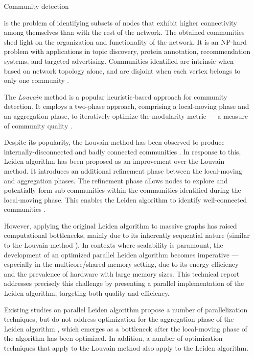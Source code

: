 Community detection is the problem of identifying subsets of nodes that exhibit higher connectivity among themselves than with the rest of the network. The obtained communities shed light on the organization and functionality of the network. It is an NP-hard problem with applications in topic discovery, protein annotation, recommendation systems, and targeted advertising. Communities identified are intrinsic when based on network topology alone, and are disjoint when each vertex belongs to only one community \cite{com-gregory10}. The \textit{Louvain} method \cite{com-blondel08} is a popular heuristic-based approach for community detection. It employs a two-phase approach, comprising a local-moving phase and an aggregation phase, to iteratively optimize the modularity metric --- a measure of community quality \cite{com-newman06}.

Despite its popularity, the Louvain method has been observed to produce internally-disconnected and badly connected communities \cite{com-traag19}. In response to this, Leiden algorithm has been proposed as an improvement over the Louvain method. It introduces an additional refinement phase between the local-moving and aggregation phases. The refinement phase allows nodes to explore and potentially form sub-communities within the communities identified during the local-moving phase. This enables the Leiden algorithm to identify well-connected communities \cite{com-traag19}.

However, applying the original Leiden algorithm to massive graphs has raised computational bottlenecks, mainly due to its inherently sequential nature (similar to the Louvain method \cite{com-halappanavar17}). In contexts where scalability is paramount, the development of an optimized parallel Leiden algorithm becomes imperative --- especially in the multicore/shared memory setting, due to its energy efficiency and the prevalence of hardware with large memory sizes. This technical report addresses precisely this challenge by presenting a parallel implementation of the Leiden algorithm, targeting both quality and efficiency.

Existing studies on parallel Leiden algorithm propose a number of parallelization techniques, but do not address optimization for the aggregation phase of the Leiden algorithm \cite{verweijfaster}, which emerges as a bottleneck after the local-moving phase of the algorithm has been optimized. In addition, a number of optimization techniques that apply to the Louvain method also apply to the Leiden algorithm.


